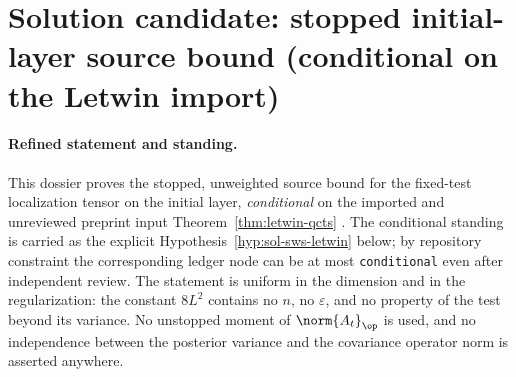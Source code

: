 \documentclass[../main.tex]{subfiles}
\begin{document}
%
\section*{Solution candidate: stopped initial-layer source bound (conditional on the
Letwin import)}
\label{sec:sol-lem-mm-stopped-window-source}

\paragraph{Refined statement and standing.}
This dossier proves the stopped, unweighted source bound for the fixed-test localization
tensor on the initial layer, \emph{conditional} on the imported and unreviewed preprint
input Theorem~\ref{thm:letwin-qcts} \cite[Thm.~1.2]{Letwin2026QuadraticKLS}.  The
conditional standing is carried as the explicit Hypothesis~\ref{hyp:sol-sws-letwin}
below; by repository constraint the corresponding ledger node can be at most
\texttt{conditional} even after independent review.  The statement is uniform in the
dimension and in the regularization: the constant $8L^2$ contains no $n$, no
$\varepsilon$, and no property of the test beyond its variance.  No unstopped moment of
$\norm{A_t}_\op$ is used, and no independence between the posterior variance and the
covariance operator norm is asserted anywhere.
\end{document}
